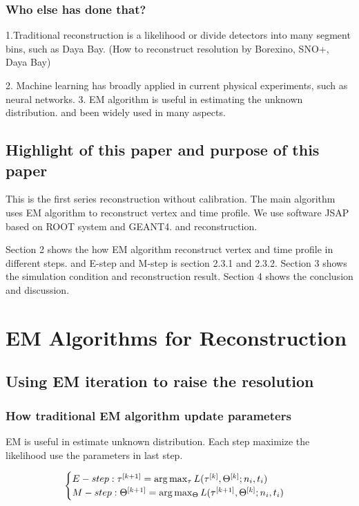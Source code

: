 \documentclass{article}
\begin{document}
\subsubsection{Who else has done that?}
\par 1.Traditional reconstruction is a likelihood or divide detectors into many segment bins, such as Daya Bay. (How to reconstruct resolution by Borexino, SNO+, Daya Bay)\\
\par 2. Machine learning has broadly applied in current physical experiments, such as neural networks. 3. EM algorithm is useful in estimating the unknown distribution. and been widely used in many aspects.

\subsection{Highlight of this paper and purpose of this paper}
\par This is the first series reconstruction without calibration. The main algorithm uses EM algorithm to reconstruct vertex and time profile. 	We use software JSAP based on ROOT system and GEANT4. and reconstruction.
\par Section 2 shows the how EM algorithm reconstruct vertex and time profile in different steps. and E-step and M-step is section 2.3.1 and 2.3.2. Section 3 shows the simulation condition and reconstruction result. Section 4 shows the conclusion and discussion.

\section{EM Algorithms for Reconstruction}
\subsection{Using EM iteration to raise the resolution}
\subsubsection{How traditional EM algorithm update parameters}
\par EM is useful in estimate unknown distribution. Each step maximize the likelihood use the parameters in last step.

	\begin{equation}
	\numberwithin{equation}{section}
		\begin{cases}
		E-step: \tau^{[k+1]} = \arg\max_{\tau}L(\tau^{[k]},\Theta^{[k]};n_i, t_i)\\
		M-step:\Theta^{[k+1]} = \arg\max_{\Theta}L(\tau^{[k+1]},\Theta^{[k]}; n_i, t_i)\\
		\end{cases}
	\end{equation}
	
\end{document}
